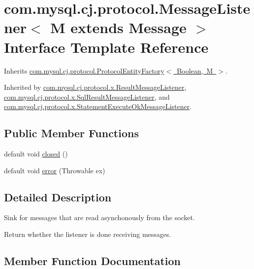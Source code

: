 \hypertarget{interfacecom_1_1mysql_1_1cj_1_1protocol_1_1_message_listener}{}\section{com.\+mysql.\+cj.\+protocol.\+Message\+Listener$<$ M extends Message $>$ Interface Template Reference}
\label{interfacecom_1_1mysql_1_1cj_1_1protocol_1_1_message_listener}


Inherits \mbox{\hyperlink{interfacecom_1_1mysql_1_1cj_1_1protocol_1_1_protocol_entity_factory}{com.\+mysql.\+cj.\+protocol.\+Protocol\+Entity\+Factory$<$ Boolean, M $>$}}.



Inherited by \mbox{\hyperlink{classcom_1_1mysql_1_1cj_1_1protocol_1_1x_1_1_result_message_listener}{com.\+mysql.\+cj.\+protocol.\+x.\+Result\+Message\+Listener}}, \mbox{\hyperlink{classcom_1_1mysql_1_1cj_1_1protocol_1_1x_1_1_sql_result_message_listener}{com.\+mysql.\+cj.\+protocol.\+x.\+Sql\+Result\+Message\+Listener}}, and \mbox{\hyperlink{classcom_1_1mysql_1_1cj_1_1protocol_1_1x_1_1_statement_execute_ok_message_listener}{com.\+mysql.\+cj.\+protocol.\+x.\+Statement\+Execute\+Ok\+Message\+Listener}}.

\subsection*{Public Member Functions}
\begin{DoxyCompactItemize}
\item 
default void \mbox{\hyperlink{interfacecom_1_1mysql_1_1cj_1_1protocol_1_1_message_listener_a7bc6393234bbbfa7609efc6fb7ff8c0b}{closed}} ()
\item 
default void \mbox{\hyperlink{interfacecom_1_1mysql_1_1cj_1_1protocol_1_1_message_listener_a9e06f02beaf29eb065149ac4f819761f}{error}} (Throwable ex)
\end{DoxyCompactItemize}


\subsection{Detailed Description}
Sink for messages that are read asynchonously from the socket.

Return whether the listener is done receiving messages. 

\subsection{Member Function Documentation}
\mbox{\label{interfacecom_1_1mysql_1_1cj_1_1protocol_1_1_message_listener_a7bc6393234bbbfa7609efc6fb7ff8c0b}} 
